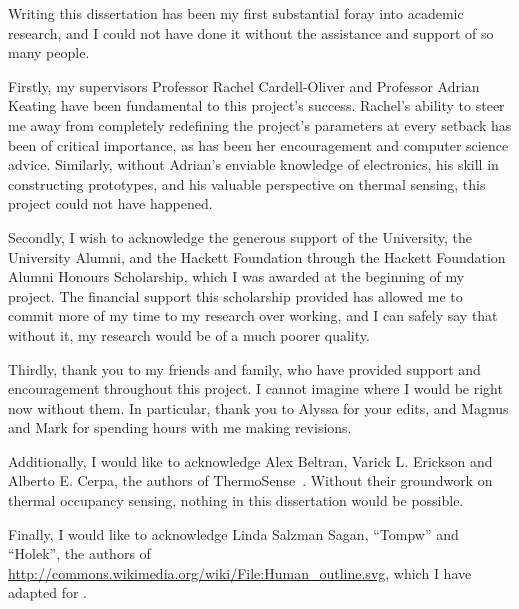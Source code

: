 \documentclass{../cshonours}
\renewcommand{\listoflistings}{%
  \cleardoublepage
  \listof{listing}{\listoflistingscaption}%
}
\begin{document}
\begin{acknowledgements}
Writing this dissertation has been my first substantial foray into academic research, and I could not have done it without the assistance and support of so many people.

Firstly, my supervisors Professor Rachel Cardell-Oliver and Professor Adrian Keating have been fundamental to this project's success. Rachel's ability to steer me away from completely redefining the project's parameters at every setback has been of critical importance, as has been her encouragement and computer science advice. Similarly, without Adrian's enviable knowledge of electronics, his skill in constructing prototypes, and his valuable perspective on thermal sensing, this project could not have happened.

Secondly, I wish to acknowledge the generous support of the University, the University Alumni, and the Hackett Foundation through the Hackett Foundation Alumni Honours Scholarship, which I was awarded at the beginning of my project. The financial support this scholarship provided has allowed me to commit more of my time to my research over working, and I can safely say that without it, my research would be of a much poorer quality.

Thirdly, thank you to my friends and family, who have provided support and encouragement throughout this project. I cannot imagine where I would be right now without them. In particular, thank you to Alyssa for your edits, and Magnus and Mark for spending hours with me making revisions.

Additionally, I would like to acknowledge Alex Beltran, Varick L. Erickson and Alberto E. Cerpa, the authors of ThermoSense~\cite{beltran2013thermosense}. Without their groundwork on thermal occupancy sensing, nothing in this dissertation would be possible.

Finally, I would like to acknowledge Linda Salzman Sagan, ``Tompw'' and ``Holek'', the authors of \url{http://commons.wikimedia.org/wiki/File:Human_outline.svg}, which I have adapted for .
\end{acknowledgements}

\tableofcontents
\listoftables
\listoffigures
\listoflistings










\appendix

\end{document}
